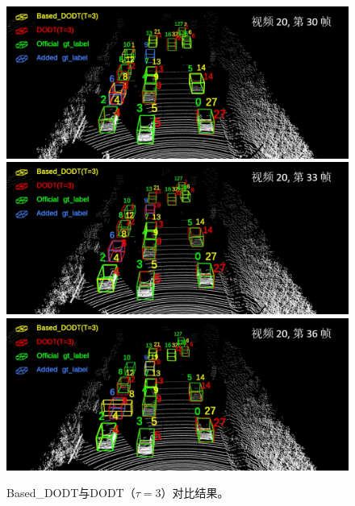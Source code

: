 \begin{figure}[t]
	\centering
	\includegraphics[width=\textwidth]{./imgs/viz_results/val/dodt_based_01.png}\vspace{1pt}
	\includegraphics[width=\textwidth]{./imgs/viz_results/val/dodt_based_02.png}\vspace{1pt}
	\includegraphics[width=\textwidth]{./imgs/viz_results/val/dodt_based_03.png}
	\caption{Based\_DODT与DODT（$\tau=3$）对比结果。}
	\label{fig:dodt_based}
\end{figure}
